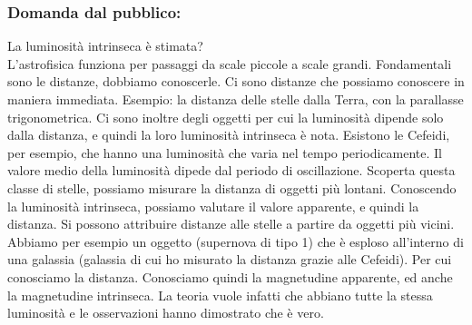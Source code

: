\documentclass[a4paper,11pt]{article}
\begin{document}
\subsubsection{Domanda dal pubblico:}
La luminosità intrinseca è stimata? \\
L'astrofisica funziona per passaggi da scale piccole a scale grandi. Fondamentali sono le distanze, dobbiamo conoscerle. Ci sono distanze che possiamo conoscere in maniera immediata. Esempio: la distanza delle stelle dalla Terra, con la parallasse trigonometrica. Ci sono inoltre degli oggetti per cui la luminosità dipende solo dalla distanza, e quindi la loro luminosità intrinseca è nota. Esistono le Cefeidi, per esempio, che hanno una luminosità che varia nel tempo periodicamente. Il valore medio della luminosità dipede dal periodo di oscillazione. Scoperta questa classe di stelle, possiamo misurare la distanza di oggetti più lontani. Conoscendo la luminosità intrinseca, possiamo valutare il valore apparente, e quindi la distanza. Si possono attribuire distanze alle stelle a partire da oggetti più vicini.\\ 
Abbiamo per esempio un oggetto (supernova di tipo 1) che è esploso all'interno di una galassia (galassia di cui ho misurato la distanza grazie alle Cefeidi). Per cui conosciamo la distanza. Conosciamo quindi la magnetudine apparente, ed anche la magnetudine intrinseca. La teoria vuole infatti che abbiano tutte la stessa luminosità e le osservazioni hanno dimostrato che è vero. \\
\end{document}
